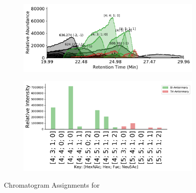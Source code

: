     \begin{figure}[tb]
        \centering
        \begin{minipage}{1\linewidth}
            \centering
            \begin{subfigure}[b]{0.49\linewidth}
                \includegraphics[width=1\linewidth, valign=t]{figure/native_igg_chromatograms.pdf}
                \subcaption{
                    \label{fig:igg_assignment:a}
                }
            \end{subfigure}
            \vspace{0pt}
            \begin{subfigure}[b]{0.49\linewidth}
                \includegraphics[width=1\linewidth, valign=b]{figure/native_igg_abundances.pdf}
                \subcaption{
                    \label{fig:igg_assignment:b}
                }
            \end{subfigure}
        \end{minipage}
        \caption{Chromatogram Assignments for \igg
            \label{fig:igg_assignments}
        }
    \end{figure}

